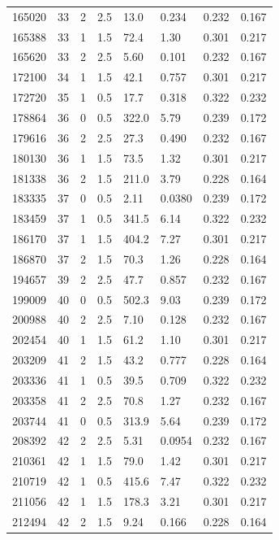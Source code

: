 \documentclass[preview]{standalone}
\begin{document}
{{{\begin{tabular}{L{1.2cm}C{1.2cm} C{0.3cm}C{0.5cm} C{1.4cm}C{1.4cm} C{1.4cm}C{1.4cm}}
  165020  &    33  & 2     & 2.5 &  13.0  & 0.234  & 0.232 &  0.167   \\ 
  165388  &    33  & 1     & 1.5 &  72.4  & 1.30  & 0.301 &  0.217   \\ 
  165620  &    33  & 2     & 2.5 &  5.60  & 0.101  & 0.232 &  0.167   \\ 
  172100  &    34  & 1     & 1.5 &  42.1  & 0.757  & 0.301 &  0.217   \\ 
  172720  &    35  & 1     & 0.5 &  17.7  & 0.318  & 0.322 &  0.232   \\ 
  178864  &    36  & 0     & 0.5 &  322.0  & 5.79  & 0.239 &  0.172   \\ 
  179616  &    36  & 2     & 2.5 &  27.3  & 0.490  & 0.232 &  0.167   \\ 
  180130  &    36  & 1     & 1.5 &  73.5  & 1.32  & 0.301 &  0.217   \\ 
  181338  &    36  & 2     & 1.5 &  211.0  & 3.79  & 0.228 &  0.164   \\ 
  183335  &    37  & 0     & 0.5 &  2.11  & 0.0380  & 0.239 &  0.172   \\ 
  183459  &    37  & 1     & 0.5 &  341.5  & 6.14  & 0.322 &  0.232   \\ 
  186170  &    37  & 1     & 1.5 &  404.2  & 7.27  & 0.301 &  0.217   \\ 
  186870  &    37  & 2     & 1.5 &  70.3  & 1.26  & 0.228 &  0.164   \\ 
  194657  &    39  & 2     & 2.5 &  47.7  & 0.857  & 0.232 &  0.167   \\ 
  199009  &    40  & 0     & 0.5 &  502.3  & 9.03  & 0.239 &  0.172   \\ 
  200988  &    40  & 2     & 2.5 &  7.10  & 0.128  & 0.232 &  0.167   \\ 
  202454  &    40  & 1     & 1.5 &  61.2  & 1.10  & 0.301 &  0.217   \\ 
  203209  &    41  & 2     & 1.5 &  43.2  & 0.777  & 0.228 &  0.164   \\ 
  203336  &    41  & 1     & 0.5 &  39.5  & 0.709  & 0.322 &  0.232   \\ 
  203358  &    41  & 2     & 2.5 &  70.8  & 1.27  & 0.232 &  0.167   \\ 
  203744  &    41  & 0     & 0.5 &  313.9  & 5.64  & 0.239 &  0.172   \\ 
  208392  &    42  & 2     & 2.5 &  5.31  & 0.0954  & 0.232 &  0.167   \\ 
  210361  &    42  & 1     & 1.5 &  79.0  & 1.42  & 0.301 &  0.217   \\ 
  210719  &    42  & 1     & 0.5 &  415.6  & 7.47  & 0.322 &  0.232   \\ 
  211056  &    42  & 1     & 1.5 &  178.3  & 3.21  & 0.301 &  0.217   \\ 
  212494  &    42  & 2     & 1.5 &  9.24  & 0.166  & 0.228 &  0.164   \\ 
\hline 
\end{tabular} 

}}}
\end{document}
